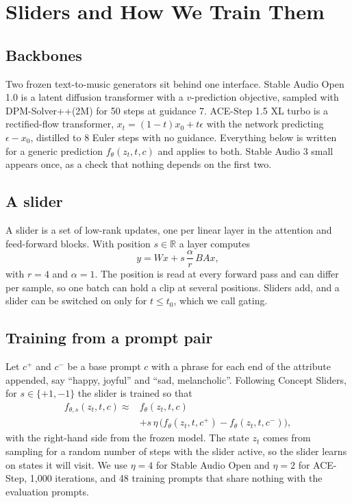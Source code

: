 \section{Sliders and How We Train Them}

\subsection{Backbones}

Two frozen text-to-music generators sit behind one interface. Stable Audio Open 1.0 \citep{evans2024sao} is a latent diffusion transformer with a $v$-prediction objective, sampled with DPM-Solver++(2M) for 50 steps at guidance 7. ACE-Step 1.5 XL turbo \citep{gong2026acestep} is a rectified-flow transformer, $x_t=(1-t)x_0+t\epsilon$ with the network predicting $\epsilon-x_0$, distilled to 8 Euler steps with no guidance. Everything below is written for a generic prediction $f_\theta(z_t,t,c)$ and applies to both. Stable Audio 3 small appears once, as a check that nothing depends on the first two.

\subsection{A slider}

A slider is a set of low-rank updates, one per linear layer in the attention and feed-forward blocks. With position $s\in\mathbb{R}$ a layer computes
\begin{equation}
  y = Wx + s\,\frac{\alpha}{r}\,BAx ,
\end{equation}
with $r=4$ and $\alpha=1$. The position is read at every forward pass and can differ per sample, so one batch can hold a clip at several positions. Sliders add, and a slider can be switched on only for $t\le t_0$, which we call gating.

\subsection{Training from a prompt pair}

Let $c^+$ and $c^-$ be a base prompt $c$ with a phrase for each end of the attribute appended, say ``happy, joyful'' and ``sad, melancholic''. Following Concept Sliders, for $s\in\{+1,-1\}$ the slider is trained so that
\begin{equation}
\begin{split}
  f_{\theta,s}(z_t,t,c) \approx{}& f_\theta(z_t,t,c) \\ &+ s\,\eta\,\bigl(f_\theta(z_t,t,c^+)-f_\theta(z_t,t,c^-)\bigr),
\end{split}\label{eq:pair}
\end{equation}
with the right-hand side from the frozen model. The state $z_t$ comes from sampling for a random number of steps with the slider active, so the slider learns on states it will visit. We use $\eta=4$ for Stable Audio Open and $\eta=2$ for ACE-Step, 1{,}000 iterations, and 48 training prompts that share nothing with the evaluation prompts.

